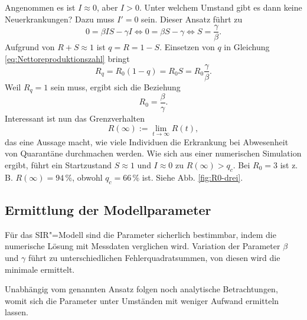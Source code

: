 \documentclass[a4paper,11pt,fleqn,twocolumn,twoside,dvipdfmx]{scrartcl}
\numberwithin{equation}{section}
\begin{document}
Angenommen es ist $I\approx 0$, aber $I>0$. Unter welchem Umstand
gibt es dann keine Neuerkrankungen? Dazu muss $I'=0$ sein. Dieser
Ansatz führt zu%
\begin{equation}
0 = \beta IS-\gamma I \Leftrightarrow 0 = \beta S-\gamma
\Leftrightarrow S = \frac{\gamma}{\beta}.
\end{equation}
Aufgrund von $R+S\approx 1$ ist $q=R=1-S$. Einsetzen von
$q$ in Gleichung \eqref{eq:Nettoreproduktionszahl} bringt%
\begin{equation}
R_q = R_0(1-q) = R_0 S = R_0\frac{\gamma}{\beta}.
\end{equation}
Weil $R_q=1$ sein muss, ergibt sich die Beziehung%
\begin{equation}
R_0 = \frac{\beta}{\gamma}.
\end{equation}
Interessant ist nun das Grenzverhalten
\begin{equation}
R(\infty) := \lim_{t\to\infty} R(t),
\end{equation}
das eine Aussage macht, wie viele Individuen die Erkrankung bei
Abwesenheit von Quarantäne durchmachen werden. Wie sich aus einer
numerischen Simulation ergibt, führt ein
Startzustand $S\approx 1$ und $I\approx 0$ zu $R(\infty)>q_c$. Bei $R_0=3$
ist z.\,B. $R(\infty)=94\,\%$, obwohl $q_c=66\,\%$ ist. Siehe Abb.
\ref{fig:R0-drei}.


\subsection{Ermittlung der Modellparameter}

Für das SIR"=Modell sind die Parameter sicherlich bestimmbar,
indem die numerische Lösung mit Messdaten verglichen wird.
Variation der Parameter $\beta$ und $\gamma$ führt zu unterschiedlichen
Fehlerquadratsummen, von diesen wird die minimale ermittelt.

Unabhängig vom genannten Ansatz folgen noch analytische Betrachtungen,
womit sich die Parameter unter Umständen mit weniger Aufwand ermitteln
lassen.
\end{document}
